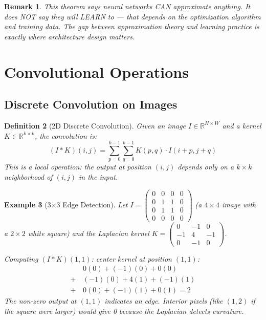 \documentclass[10pt,twocolumn]{article}
\newtheorem{definition}{Definition}[section]
\newtheorem{remark}[definition]{Remark}
\newtheorem{example}[definition]{Example}
\begin{document}
\begin{remark}
This theorem says neural networks CAN approximate anything. It does NOT say they will LEARN to --- that depends on the optimization algorithm and training data. The gap between approximation theory and learning practice is exactly where architecture design matters.
\end{remark}

\section{Convolutional Operations}

\subsection{Discrete Convolution on Images}

\begin{definition}[2D Discrete Convolution]
Given an image $I \in \mathbb{R}^{H \times W}$ and a kernel $K \in \mathbb{R}^{k \times k}$, the convolution is:
\begin{equation}
(I * K)(i,j) = \sum_{p=0}^{k-1} \sum_{q=0}^{k-1} K(p,q) \cdot I(i+p, j+q)
\end{equation}
This is a \emph{local} operation: the output at position $(i,j)$ depends only on a $k \times k$ neighborhood of $(i,j)$ in the input.
\end{definition}

\begin{example}[3$\times$3 Edge Detection]\label{ex:conv}
Let $I = \begin{pmatrix} 0 & 0 & 0 & 0 \\ 0 & 1 & 1 & 0 \\ 0 & 1 & 1 & 0 \\ 0 & 0 & 0 & 0 \end{pmatrix}$ (a $4\times4$ image with a $2\times2$ white square) and the Laplacian kernel $K = \begin{pmatrix} 0 & -1 & 0 \\ -1 & 4 & -1 \\ 0 & -1 & 0 \end{pmatrix}$.

Computing $(I * K)(1,1)$: center kernel at position $(1,1)$:
\begin{align*}
&0(0)+(-1)(0)+0(0) \\
+\,&(-1)(0)+4(1)+(-1)(1) \\
+\,&0(0)+(-1)(1)+0(1) = 2
\end{align*}
The non-zero output at $(1,1)$ indicates an edge. Interior pixels (like $(1,2)$ if the square were larger) would give 0 because the Laplacian detects curvature.
\end{example}
\end{document}
